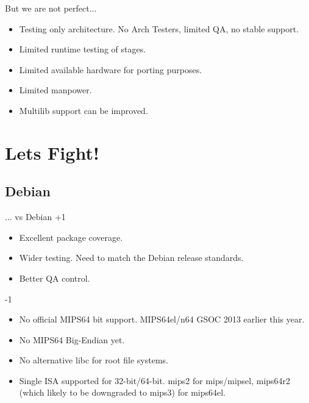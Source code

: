 \documentclass{beamer}
\begin{document}
\begin{frame}{But we are not perfect...}
	\begin{itemize}
		\item Testing only architecture. No Arch Testers, limited QA, no stable support.
		\item Limited runtime testing of stages.
		\item Limited available hardware for porting purposes.
		\item Limited manpower.
		\item Multilib support can be improved.
	\end{itemize}
\end{frame}


\section{Lets Fight{!}}

\subsection{Debian}
\begin{frame}{... vs Debian}
+1
	\begin{itemize}
		\item Excellent package coverage.
		\item Wider testing. Need to match the Debian release standards.
		\item Better QA control.
	\end{itemize}
-1
	\begin{itemize}
		\item No official MIPS64 bit support. MIPS64el/n64 GSOC 2013 earlier this year.
		\item No MIPS64 Big-Endian yet.
		\item No alternative libc for root file systems.
		\item Single ISA supported for 32-bit/64-bit. mips2 for mips/mipsel, mips64r2 (which likely to be downgraded to mips3) for mips64el.
	\end{itemize}
\end{frame}
\end{document}
